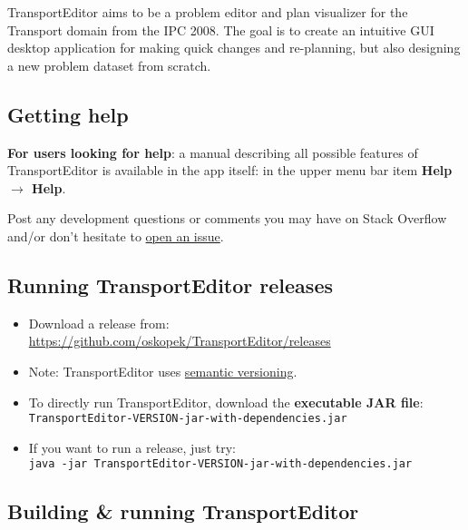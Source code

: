 TransportEditor aims to be a problem editor and plan visualizer for the Transport domain from the IPC 2008.
The goal is to create an intuitive GUI desktop application for making quick changes and re-planning,
but also designing a new problem dataset from scratch.

\subsection*{Getting help}

\textbf{For users looking for help}: a manual describing all possible features of TransportEditor is available in the app itself:
in the upper menu bar item \textbf{Help $\to$ Help}.

Post any development questions or comments you may have on Stack Overflow and/or don't hesitate to
\href{https://gitlab.com/oskopek/TransportEditor/issues}{open an issue}.

\subsection*{Running TransportEditor releases}
\begin{itemize}
\item Download a release from:\\ \url{https://github.com/oskopek/TransportEditor/releases}

\item Note: TransportEditor uses \href{http://semver.org/}{semantic versioning}.

\item To directly run TransportEditor, download the \textbf{executable JAR file}: \texttt{TransportEditor-VERSION-jar-with-dependencies.jar}

\item If you want to run a release, just try:\\ \texttt{java -jar TransportEditor-VERSION-jar-with-dependencies.jar}
\end{itemize}

\subsection*{Building \& running TransportEditor}\label{readme-building}

